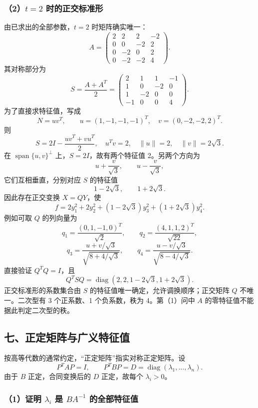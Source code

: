 \documentclass[11pt,fontset=fandol]{ctexart}
\begin{document}
\subsubsection{\texorpdfstring{（2）\(t=2\)
时的正交标准形}{（2）t=2 时的正交标准形}}\label{t2-ux65f6ux7684ux6b63ux4ea4ux6807ux51c6ux5f62}

由已求出的全部参数，\(t=2\) 时矩阵确实唯一： \[
A=\begin{pmatrix}
2&2&2&-2\\
0&0&-2&2\\
0&-2&0&2\\
0&-2&-2&4
\end{pmatrix}.
\] 其对称部分为 \[
S=\frac{A+A^T}{2}
=\begin{pmatrix}
2&1&1&-1\\
1&0&-2&0\\
1&-2&0&0\\
-1&0&0&4
\end{pmatrix}.
\] 为了直接求特征值，写成 \[
N=uv^T,\qquad
u=(1,-1,-1,-1)^T,\quad v=(0,-2,-2,2)^T.
\] 则 \[
S=2I-\frac{uv^T+vu^T}{2},\quad
u^Tv=2,\quad\|u\|=2,\quad\|v\|=2\sqrt3.
\] 在 \(\operatorname{span}\{u,v\}^\perp\) 上，\(S=2I\)，故有两个特征值
2。另两个方向为 \[
u+\frac{v}{\sqrt3},\qquad u-\frac{v}{\sqrt3},
\] 它们互相垂直，分别对应 \(S\) 的特征值 \[
1-2\sqrt3,\qquad1+2\sqrt3.
\] 因此存在正交变换 \(X=QY\)，使 \[
\boxed{f=2y_1^2+2y_2^2+(1-2\sqrt3)y_3^2+(1+2\sqrt3)y_4^2.}
\] 例如可取 \(Q\) 的列向量为 \[
q_1=\frac{(0,1,-1,0)^T}{\sqrt2},\qquad
q_2=\frac{(4,1,1,2)^T}{\sqrt{22}},
\] \[
q_3=\frac{u+v/\sqrt3}{\sqrt{8+4/\sqrt3}},\qquad
q_4=\frac{u-v/\sqrt3}{\sqrt{8-4/\sqrt3}}.
\] 直接验证 \(Q^TQ=I\)，且 \[
Q^TSQ=\operatorname{diag}(2,2,1-2\sqrt3,1+2\sqrt3).
\] 正交标准形的系数集合由 \(S\) 的特征值唯一确定，允许调换顺序；正交矩阵
\(Q\) 不唯一。二次型有 3 个正系数、1 个负系数，秩为 4。第（1）问中 \(A\)
的零特征值不能据此判定二次型的秩。

\subsection{七、正定矩阵与广义特征值}\label{ux4e03ux6b63ux5b9aux77e9ux9635ux4e0eux5e7fux4e49ux7279ux5f81ux503c}

按高等代数的通常约定，``正定矩阵''指实对称正定矩阵。设 \[
P^TAP=I,\qquad P^TBP=D=\operatorname{diag}(\lambda_1,\ldots,\lambda_n).
\] 由于 \(B\) 正定，合同变换后的 \(D\) 正定，故每个 \(\lambda_i>0\)。

\subsubsection{\texorpdfstring{（1）证明 \(\lambda_i\) 是 \(BA^{-1}\)
的全部特征值}{（1）证明 \textbackslash lambda\_i 是 BA\^{}\{-1\} 的全部特征值}}\label{ux8bc1ux660e-lambda_i-ux662f-ba-1-ux7684ux5168ux90e8ux7279ux5f81ux503c}
\end{document}
